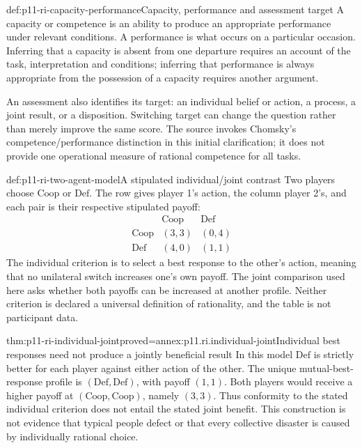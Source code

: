 \begin{hbdefinition}{def:p11-ri-capacity-performance}{Capacity, performance and assessment target}
A capacity or competence is an ability to produce an appropriate
performance under relevant conditions. A performance is what occurs
on a particular occasion. Inferring that a capacity is absent from
one departure requires an account of the task, interpretation and
conditions; inferring that performance is always appropriate from
the possession of a capacity requires another argument.

An assessment also identifies its target: an individual belief or
action, a process, a joint result, or a disposition. Switching target
can change the question rather than merely improve the same score.
The source invokes Chomsky's competence/performance distinction in
this initial clarification; it does not provide one operational measure
of rational competence for all tasks.
\end{hbdefinition}

\begin{hbdefinition}{def:p11-ri-two-agent-model}{A stipulated individual/joint contrast}
Two players choose \(\mathrm{Coop}\) or \(\mathrm{Def}\).
The row gives player 1's action, the column player 2's, and each pair
is their respective stipulated payoff:
\[
\begin{array}{c|cc}
 &\mathrm{Coop}&\mathrm{Def}\\\hline
\mathrm{Coop}&(3,3)&(0,4)\\
\mathrm{Def}&(4,0)&(1,1)
\end{array}
\]
The individual criterion is to select a best response to the other's
action, meaning that no unilateral switch increases one's own payoff.
The joint comparison used here asks whether both payoffs can be increased
at another profile. Neither criterion is declared a universal definition
of rationality, and the table is not participant data.
\end{hbdefinition}

\begin{hbtheorem}{thm:p11-ri-individual-joint}{proved=annex:p11.ri.individual-joint}{Individual best responses need not produce a jointly beneficial result}
In this model \(\mathrm{Def}\) is strictly better for each player
against either action of the other. The unique mutual-best-response
profile is \((\mathrm{Def},\mathrm{Def})\), with payoff \((1,1)\).
Both players would receive a higher payoff at
\((\mathrm{Coop},\mathrm{Coop})\), namely \((3,3)\).
Thus conformity to the stated individual criterion does not entail
the stated joint benefit. This construction is not evidence that
typical people defect or that every collective disaster is caused
by individually rational choice.
\end{hbtheorem}

